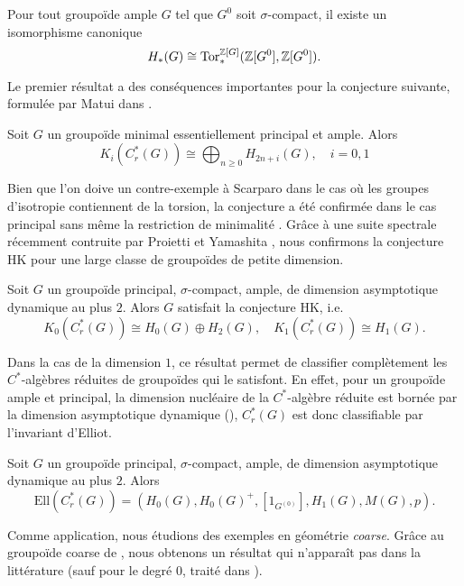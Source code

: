 \documentclass[a4paper,11pt]{article}
\begin{document}
\begin{thmx}
Pour tout groupoïde ample $G$ tel que $G^0$ soit $\sigma$-compact, il existe un isomorphisme canonique 
$$ H_*(G)\cong \text{Tor}_*^{\mathbb Z[G]}(\mathbb Z[G^0],\mathbb Z[G^0]).$$
\end{thmx}

Le premier résultat a des conséquences importantes pour la conjecture suivante, formulée par Matui dans \cite{Matui2016}.

\begin{conjecture*}[HK]
	Soit $G$ un groupoïde minimal essentiellement principal et ample. Alors
	$$K_i(C_r^*(G))\cong \bigoplus_{n\geq 0}H_{2n+i}(G),\quad i=0,1$$
\end{conjecture*}

Bien que l'on doive un contre-exemple à Scarparo \cite{Scarparo2020} dans le cas où les groupes d'isotropie contiennent de la torsion, la conjecture a été confirmée dans le cas principal sans même la restriction de minimalité \cite{Farsi2019,Matui2016,Ortega2020,Yi20}. Grâce à une suite spectrale récemment contruite par Proietti et Yamashita \cite{Proietti2020}, nous confirmons la conjecture HK pour une large classe de groupoïdes de petite dimension.

\begin{corx}
	Soit $G$ un groupoïde principal, $\sigma$-compact, ample, de dimension asymptotique dynamique au plus $2$. Alors $G$ satisfait la conjecture HK, i.e.
	$$K_0(C_r^*(G))\cong H_0(G)\oplus H_2(G),\quad K_1(C_r^*(G))\cong H_1(G).$$
\end{corx}

Dans la cas de la dimension $1$, ce résultat permet de classifier complètement les $C^*$-algèbres réduites de groupoïdes qui le satisfont. En effet, pour un groupoïde ample et principal, la dimension nucléaire de la $C^*$-algèbre réduite est bornée par la dimension asymptotique dynamique (\cite{Guentner:2014aa}), $C^*_r(G)$ est donc classifiable par l'invariant d'Elliot.   

\begin{corx}
	Soit $G$ un groupoïde principal, $\sigma$-compact, ample, de dimension asymptotique dynamique au plus $2$. Alors 
	$$\mathrm{Ell}(C_r^*(G))=(H_0(G),H_0(G)^+,[1_{G^{(0)}}],H_1(G),M(G),p).$$
\end{corx}

Comme application, nous étudions des exemples en géométrie \textit{coarse}. Grâce au groupoïde coarse de \cite{SkTuYu}, nous obtenons un résultat qui n'apparaît pas dans la littérature (sauf pour le degré $0$, traité dans \cite{Ara2020}).
\end{document}
